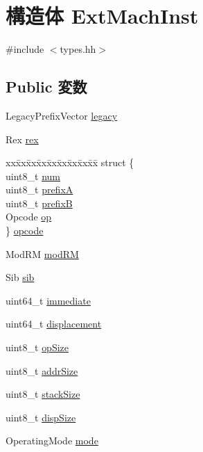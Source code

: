 \hypertarget{structX86ISA_1_1ExtMachInst}{
\section{構造体 ExtMachInst}
\label{structX86ISA_1_1ExtMachInst}
}


{\ttfamily \#include $<$types.hh$>$}\subsection*{Public 変数}
\begin{DoxyCompactItemize}
\item 
LegacyPrefixVector \hyperlink{structX86ISA_1_1ExtMachInst_ae6eac40de20d4dfad6119c149fa08bdf}{legacy}
\item 
Rex \hyperlink{structX86ISA_1_1ExtMachInst_aa92db536231767bdd06da2405c873fa5}{rex}
\item 
\begin{tabbing}
xx\=xx\=xx\=xx\=xx\=xx\=xx\=xx\=xx\=\kill
struct \{\\
\>uint8\_t \hyperlink{structX86ISA_1_1ExtMachInst_abea371f9030e15a5d2a4c181576833d8}{num}\\
\>uint8\_t \hyperlink{structX86ISA_1_1ExtMachInst_afde55dd36a94f53ae11872b4a09f8c6f}{prefixA}\\
\>uint8\_t \hyperlink{structX86ISA_1_1ExtMachInst_ab63c1254b3154aac44b912410132e1d8}{prefixB}\\
\>Opcode \hyperlink{structX86ISA_1_1ExtMachInst_a5e5ff18010ff9820bd372202dc1621cc}{op}\\
\} \hyperlink{structX86ISA_1_1ExtMachInst_a97950cf89d730948baf40c15001b8b4f}{opcode}\\

\end{tabbing}\item 
ModRM \hyperlink{structX86ISA_1_1ExtMachInst_a375b5371f85938240bbc2cc9384ff42b}{modRM}
\item 
Sib \hyperlink{structX86ISA_1_1ExtMachInst_ad4324932256063057593479e8749451a}{sib}
\item 
uint64\_\-t \hyperlink{structX86ISA_1_1ExtMachInst_a9aa055986422c3d19a301e5570920d6b}{immediate}
\item 
uint64\_\-t \hyperlink{structX86ISA_1_1ExtMachInst_a1d6b86d21c3d7e7330f7bfc5650063b7}{displacement}
\item 
uint8\_\-t \hyperlink{structX86ISA_1_1ExtMachInst_ad3cabad3e6f648d2da97051c2b37229b}{opSize}
\item 
uint8\_\-t \hyperlink{structX86ISA_1_1ExtMachInst_aaff1bd964b905dbe543c06ee011c7462}{addrSize}
\item 
uint8\_\-t \hyperlink{structX86ISA_1_1ExtMachInst_aa9ff7192e7079f61c1cea13a63565361}{stackSize}
\item 
uint8\_\-t \hyperlink{structX86ISA_1_1ExtMachInst_a65845942a375312c889d80674ababdbc}{dispSize}
\item 
OperatingMode \hyperlink{structX86ISA_1_1ExtMachInst_a176b95968dcffd49825129e0985c92af}{mode}
\end{DoxyCompactItemize}


